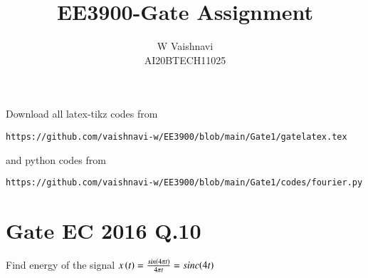 \documentclass[journal,12pt,twocolumn]{IEEEtran}
\begin{document}
\title{EE3900-Gate Assignment}
\author{W Vaishnavi\\AI20BTECH11025}
\maketitle
\newpage
\bigskip
\renewcommand{\thefigure}{\theenumi}
\renewcommand{\thetable}{\theenumi}
Download all latex-tikz codes from 
%
\begin{lstlisting}
https://github.com/vaishnavi-w/EE3900/blob/main/Gate1/gatelatex.tex
\end{lstlisting}
and python codes from 
%
\begin{lstlisting}
https://github.com/vaishnavi-w/EE3900/blob/main/Gate1/codes/fourier.py
\end{lstlisting}
\section{Gate EC 2016 Q.10}
Find energy of the signal $x\left(t\right) = \frac{sin\left(4\pi t\right)}{4 \pi t} = sinc{\left(4t\right)}$
\end{document}
